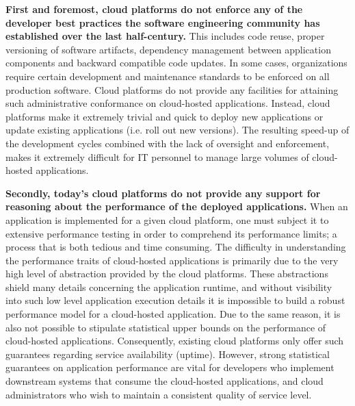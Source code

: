 \textbf{First and foremost, cloud platforms do not enforce any of the developer best practices
the software engineering community has established over the last half-century.} This
includes code reuse, proper versioning of software artifacts, dependency management
between application components and backward compatible code updates. In
some cases, organizations require certain development and maintenance standards to be enforced on
all production software. Cloud platforms do not provide any facilities for attaining
such administrative conformance on cloud-hosted applications. Instead, cloud platforms
make it extremely trivial and quick to deploy new applications or update existing
applications (i.e. roll out new versions). The resulting speed-up of the development cycles combined with the lack of 
oversight and enforcement, makes it extremely difficult for 
IT personnel to manage large volumes of cloud-hosted applications.

\textbf{Secondly, today's cloud platforms do not provide any support for reasoning about the 
performance of the deployed applications.} When an application is implemented for
a given cloud platform, one must subject it to extensive performance testing in order
to comprehend its performance limits; a process that is both 
tedious and time consuming. The difficulty in understanding the performance 
traits of cloud-hosted applications is primarily due to the very high level of 
abstraction provided by the cloud platforms. These abstractions shield many details 
concerning the application runtime, and without visibility into such low level application 
execution details it is impossible
to build a robust performance model for a cloud-hosted application. Due to the same
reason, it is also not possible to stipulate statistical upper bounds on
the performance of cloud-hosted applications. 
Consequently, existing cloud platforms only offer such guarantees regarding service availability (uptime).
However, strong statistical guarantees on application performance are vital for developers 
who implement downstream systems that consume the cloud-hosted applications,
and cloud administrators who wish to maintain a consistent quality of service
level.

